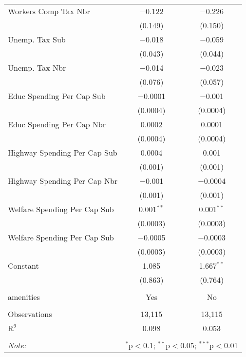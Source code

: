 \begin{table}[!htbp]
\begin{tabular}{@{\extracolsep{5pt}}lcc}
  Workers Comp Tax Nbr & $-$0.122 & $-$0.226 \\ 
  & (0.149) & (0.150) \\ 
  Unemp. Tax Sub & $-$0.018 & $-$0.059 \\ 
  & (0.043) & (0.044) \\ 
  Unemp. Tax Nbr & $-$0.014 & $-$0.023 \\ 
  & (0.076) & (0.057) \\ 
  Educ Spending Per Cap Sub & $-$0.0001 & $-$0.001 \\ 
  & (0.0004) & (0.0004) \\ 
  Educ Spending Per Cap Nbr & 0.0002 & 0.0001 \\ 
  & (0.0004) & (0.0004) \\ 
  Highway Spending Per Cap Sub & 0.0004 & 0.001 \\ 
  & (0.001) & (0.001) \\ 
  Highway Spending Per Cap Nbr & $-$0.001 & $-$0.0004 \\ 
  & (0.001) & (0.001) \\ 
  Welfare Spending Per Cap Sub & 0.001$^{**}$ & 0.001$^{**}$ \\ 
  & (0.0003) & (0.0003) \\ 
  Welfare Spending Per Cap Sub & $-$0.0005 & $-$0.0003 \\ 
  & (0.0003) & (0.0003) \\ 
  Constant & 1.085 & 1.667$^{**}$ \\ 
  & (0.863) & (0.764) \\ 
 \hline \\[-1.8ex] 
amenities & Yes & No \\ 
\hline \\[-1.8ex] 
Observations & 13,115 & 13,115 \\ 
R$^{2}$ & 0.098 & 0.053 \\ 
\hline 
\hline \\[-1.8ex] 
\textit{Note:}  & \multicolumn{2}{r}{$^{*}$p$<$0.1; $^{**}$p$<$0.05; $^{***}$p$<$0.01} \\ 
\end{tabular} 
\end{table} 
